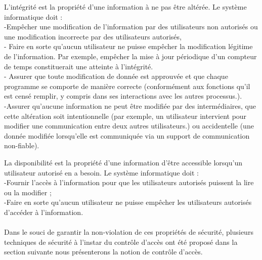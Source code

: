 \label{sectionIntégrité}

L'intégrité est la propriété d'une information à ne pas être altérée. Le système informatique doit \cite{theseBenoit} :\\
-Empêcher une modification de l'information par des utilisateurs non autorisés ou une modification incorrecte par des utilisateurs autorisés, \\
- Faire en sorte qu'aucun utilisateur ne puisse empêcher la modification légitime de l'information. Par exemple, empêcher la mise à jour périodique d'un compteur de temps constituerait une atteinte à l'intégrité. \\
- Assurer que toute modification de donnée est approuvée et que chaque programme se comporte de manière correcte (conformément aux fonctions qu'il est censé remplir, y compris dans ses interactions avec les autres processus.). \\
-Assurer qu'aucune information ne peut être modifiée par des intermédiaires, que cette altération soit intentionnelle (par exemple, un utilisateur intervient pour modifier une communication entre deux autres utilisateurs.) ou accidentelle (une donnée modifiée lorsqu'elle est communiquée via un support de communication non-fiable).

\label{sectionDisponibilité}
La disponibilité est la propriété d'une information d'être accessible lorsqu'un utilisateur autorisé en a besoin. Le système informatique doit \cite{theseBenoit}:\\
-Fournir l'accès à l'information pour que les utilisateurs autorisés puissent la lire ou la modifier ; \\
-Faire en sorte qu'aucun utilisateur ne puisse empêcher les utilisateurs autorisés d'accéder à l'information.

\paragraph{} Dans le souci de garantir la non-violation de ces propriétés de sécurité, plusieurs techniques de sécurité à l'instar du contrôle d'accès ont été proposé dans la section suivante nous présenterons la notion de contrôle d'accès.

\label{sectionContrôle}

\label{sectionDéfinition}

